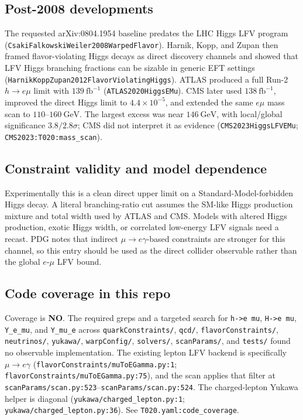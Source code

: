 \subsection*{Post-2008 developments}
The requested arXiv:0804.1954 baseline predates the LHC Higgs LFV program
(\texttt{CsakiFalkowskiWeiler2008WarpedFlavor}).  Harnik, Kopp, and Zupan
then framed flavor-violating Higgs decays as direct discovery channels and
showed that LFV Higgs branching fractions can be sizable in generic EFT
settings (\texttt{HarnikKoppZupan2012FlavorViolatingHiggs}).  ATLAS produced a
full Run-2 \(h\to e\mu\) limit with
\(139~\mathrm{fb}^{-1}\) (\texttt{ATLAS2020HiggsEMu}).  CMS later used
\(138~\mathrm{fb}^{-1}\), improved the direct Higgs limit to
\(4.4\times10^{-5}\), and extended the same \(e\mu\) mass scan to
\(110\)--\(160~\mathrm{GeV}\).  The largest excess was near
\(146~\mathrm{GeV}\), with local/global significance \(3.8/2.8\sigma\);
CMS did not interpret it as evidence (\texttt{CMS2023HiggsLFVEMu};
\texttt{CMS2023:T020:mass\_scan}).

\subsection*{Constraint validity and model dependence}
Experimentally this is a clean direct upper limit on a Standard-Model-forbidden
Higgs decay.  A literal branching-ratio cut assumes the SM-like Higgs
production mixture and total width used by ATLAS and CMS.  Models with altered
Higgs production, exotic Higgs width, or correlated low-energy LFV signals need
a recast.  PDG notes that indirect \(\mu\to e\gamma\)-based constraints are
stronger for this channel, so this entry should be used as the direct collider
observable rather than the global \(e\)-\(\mu\) LFV bound.

\subsection*{Code coverage in this repo}
Coverage is \textbf{NO}.  The required greps and a targeted search for
\texttt{h->e mu}, \texttt{H->e mu}, \texttt{Y\_e\_mu}, and \texttt{Y\_mu\_e}
across \texttt{quarkConstraints/}, \texttt{qcd/}, \texttt{flavorConstraints/},
\texttt{neutrinos/}, \texttt{yukawa/}, \texttt{warpConfig/}, \texttt{solvers/},
\texttt{scanParams/}, and \texttt{tests/} found no observable implementation.
The existing lepton LFV backend is specifically \(\mu\to e\gamma\)
(\texttt{flavorConstraints/muToEGamma.py:1};
\texttt{flavorConstraints/muToEGamma.py:75}), and the scan applies that filter
at \texttt{scanParams/scan.py:523}--\texttt{scanParams/scan.py:524}.  The
charged-lepton Yukawa helper is diagonal
(\texttt{yukawa/charged\_lepton.py:1}; \texttt{yukawa/charged\_lepton.py:36}).
See \texttt{T020.yaml:code\_coverage}.

